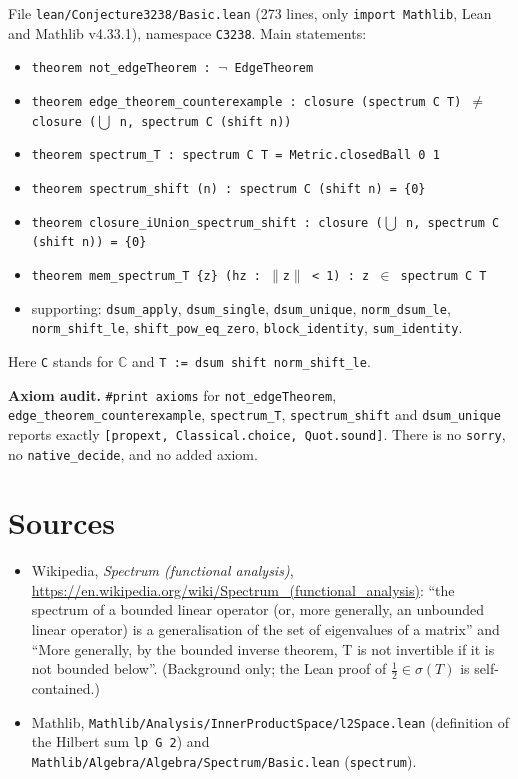 \documentclass[11pt]{article}
\theoremstyle{definition}
\begin{document}
File \texttt{lean/Conjecture3238/Basic.lean} (273 lines, only \texttt{import Mathlib}, Lean and
Mathlib v4.33.1), namespace \texttt{C3238}. Main statements:
\begin{itemize}
\item \texttt{theorem not\_edgeTheorem : $\neg$ EdgeTheorem}
\item \texttt{theorem edge\_theorem\_counterexample : closure (spectrum C T) $\ne$ closure
  ($\bigcup$ n, spectrum C (shift n))}
\item \texttt{theorem spectrum\_T : spectrum C T = Metric.closedBall 0 1}
\item \texttt{theorem spectrum\_shift (n) : spectrum C (shift n) = \{0\}}
\item \texttt{theorem closure\_iUnion\_spectrum\_shift : closure ($\bigcup$ n, spectrum C (shift n))
  = \{0\}}
\item \texttt{theorem mem\_spectrum\_T \{z\} (hz : $\|$z$\|$ < 1) : z $\in$ spectrum C T}
\item supporting: \texttt{dsum\_apply}, \texttt{dsum\_single}, \texttt{dsum\_unique},
  \texttt{norm\_dsum\_le}, \texttt{norm\_shift\_le}, \texttt{shift\_pow\_eq\_zero},
  \texttt{block\_identity}, \texttt{sum\_identity}.
\end{itemize}
Here \texttt{C} stands for $\mathbb{C}$ and \texttt{T := dsum shift norm\_shift\_le}.

\textbf{Axiom audit.} \texttt{\#print axioms} for \texttt{not\_edgeTheorem},
\texttt{edge\_theorem\_counterexample}, \texttt{spectrum\_T}, \texttt{spectrum\_shift} and
\texttt{dsum\_unique} reports exactly \texttt{[propext, Classical.choice, Quot.sound]}. There is no
\texttt{sorry}, no \texttt{native\_decide}, and no added axiom.

\section*{Sources}
\begin{itemize}
\item Wikipedia, \emph{Spectrum (functional analysis)},
  \url{https://en.wikipedia.org/wiki/Spectrum_(functional_analysis)}: ``the spectrum of a bounded
  linear operator (or, more generally, an unbounded linear operator) is a generalisation of the set
  of eigenvalues of a matrix'' and ``More generally, by the bounded inverse theorem, T is not
  invertible if it is not bounded below''. (Background only; the Lean proof of
  $\tfrac12\in\sigma(T)$ is self-contained.)
\item Mathlib, \texttt{Mathlib/Analysis/InnerProductSpace/l2Space.lean} (definition of the Hilbert
  sum \texttt{lp G 2}) and \texttt{Mathlib/Algebra/Algebra/Spectrum/Basic.lean} (\texttt{spectrum}).
\end{itemize}
\end{document}
